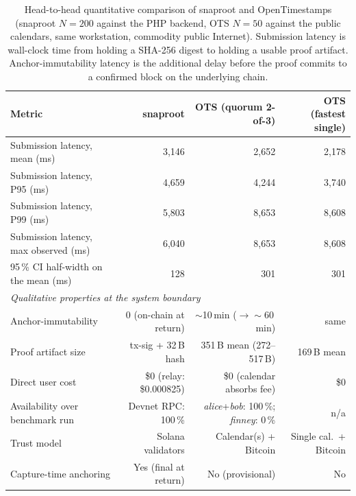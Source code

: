 \documentclass[11pt,a4paper]{article}
\begin{document}
\begin{table}[!htbp]
\centering
\small
\caption{Head-to-head quantitative comparison of snaproot and
OpenTimestamps (snaproot $N = 200$ against the PHP backend, OTS
$N = 50$ against the public calendars, same workstation, commodity
public Internet). Submission latency is wall-clock time from holding a
SHA-256 digest to holding a usable proof artifact. Anchor-immutability
latency is the additional delay before the proof commits to a confirmed
block on the underlying chain.}
\label{tab:ots-comparison}
\begin{tabularx}{\linewidth}{X r r r}
\toprule
\textbf{Metric} & \textbf{snaproot} & \textbf{OTS (quorum 2-of-3)} &
\textbf{OTS (fastest single)} \\
\midrule
Submission latency, mean (ms)         & 3{,}146 & 2{,}652 & 2{,}178 \\
Submission latency, P95 (ms)          & 4{,}659 & 4{,}244 & 3{,}740 \\
Submission latency, P99 (ms)          & 5{,}803 & 8{,}653 & 8{,}608 \\
Submission latency, max observed (ms) & 6{,}040 & 8{,}653 & 8{,}608 \\
95\,\% CI half-width on the mean (ms) &   128   &   301   &   301   \\
\midrule
\multicolumn{4}{l}{\emph{Qualitative properties at the system boundary}} \\
Anchor-immutability
  & 0 (on-chain at return)
  & $\sim$10\,min ($\to\sim$60\,min)
  & same \\
Proof artifact size
  & tx-sig + 32\,B hash
  & 351\,B mean (272--517\,B)
  & 169\,B mean \\
Direct user cost
  & \$0 (relay: \$0.000825)
  & \$0 (calendar absorbs fee)
  & \$0 \\
Availability over benchmark run
  & Devnet RPC: 100\,\%
  & \textit{alice}+\textit{bob}: 100\,\%; \textit{finney}: 0\,\%
  & n/a \\
Trust model
  & Solana validators
  & Calendar(s) + Bitcoin
  & Single cal.\ + Bitcoin \\
Capture-time anchoring
  & Yes (final at return)
  & No (provisional)
  & No \\
\bottomrule
\end{tabularx}
\end{table}
\end{document}

